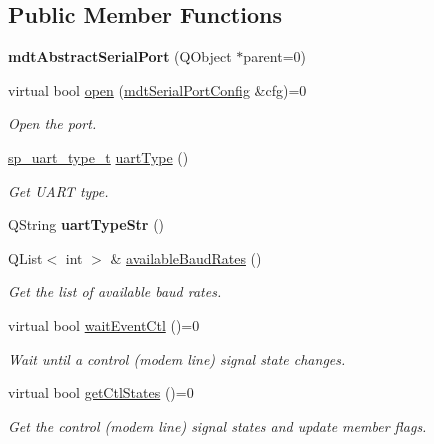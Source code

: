 \subsection*{Public Member Functions}
\begin{DoxyCompactItemize}
\item 
\hypertarget{classmdt_abstract_serial_port_ae379b6151edebc1518e81ec061e379db}{
{\bfseries mdtAbstractSerialPort} (QObject $\ast$parent=0)}
\label{classmdt_abstract_serial_port_ae379b6151edebc1518e81ec061e379db}

\item 
virtual bool \hyperlink{classmdt_abstract_serial_port_ad96a99c370c87d7e4a8b47f98cc7ce35}{open} (\hyperlink{classmdt_serial_port_config}{mdtSerialPortConfig} \&cfg)=0
\begin{DoxyCompactList}\small\item\em Open the port. \end{DoxyCompactList}\item 
\hypertarget{classmdt_abstract_serial_port_a6b153155d9e110336d51ec48d2cee203}{
\hyperlink{classmdt_abstract_serial_port_a56b107c57fb0acb17cfcca262abe6a54}{sp\_\-uart\_\-type\_\-t} \hyperlink{classmdt_abstract_serial_port_a6b153155d9e110336d51ec48d2cee203}{uartType} ()}
\label{classmdt_abstract_serial_port_a6b153155d9e110336d51ec48d2cee203}

\begin{DoxyCompactList}\small\item\em Get UART type. \end{DoxyCompactList}\item 
\hypertarget{classmdt_abstract_serial_port_a669c9ce68455abd3cfdb98259996e701}{
QString {\bfseries uartTypeStr} ()}
\label{classmdt_abstract_serial_port_a669c9ce68455abd3cfdb98259996e701}

\item 
\hypertarget{classmdt_abstract_serial_port_aecd76bff0f93cb86c3bbfd73e3776032}{
QList$<$ int $>$ \& \hyperlink{classmdt_abstract_serial_port_aecd76bff0f93cb86c3bbfd73e3776032}{availableBaudRates} ()}
\label{classmdt_abstract_serial_port_aecd76bff0f93cb86c3bbfd73e3776032}

\begin{DoxyCompactList}\small\item\em Get the list of available baud rates. \end{DoxyCompactList}\item 
virtual bool \hyperlink{classmdt_abstract_serial_port_ac27d1224db349bcf7f161329b5f53efb}{waitEventCtl} ()=0
\begin{DoxyCompactList}\small\item\em Wait until a control (modem line) signal state changes. \end{DoxyCompactList}\item 
virtual bool \hyperlink{classmdt_abstract_serial_port_aaeacd26b220ab0f8c521cef74edfafdd}{getCtlStates} ()=0
\begin{DoxyCompactList}\small\item\em Get the control (modem line) signal states and update member flags. \end{DoxyCompactList}\end{DoxyCompactItemize}
